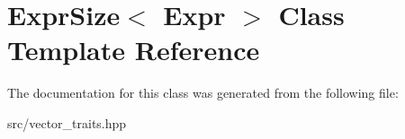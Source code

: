 \hypertarget{classExprSize}{}\section{Expr\+Size$<$ Expr $>$ Class Template Reference}
\label{classExprSize}


The documentation for this class was generated from the following file\+:\begin{DoxyCompactItemize}
\item 
src/vector\+\_\+traits.\+hpp\end{DoxyCompactItemize}
